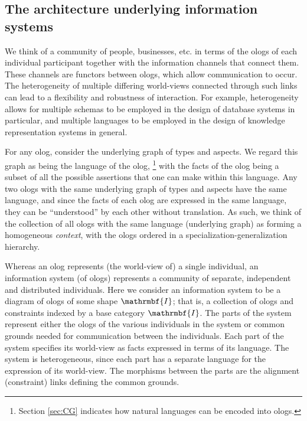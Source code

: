 \documentclass{amsart}
\theoremstyle{remark}
\theoremstyle{definition}
\begin{document}
\subsection{The architecture underlying information systems}

We think of a community of people, businesses, etc. in terms of the ologs of each individual participant together with the information channels that connect them. These channels are functors between ologs, which allow communication to occur. The heterogeneity of multiple differing world-views 
connected through such links can lead to a flexibility and robustness of interaction. 
For example, heterogeneity allows for multiple schemas to be employed in the design of database systems in particular, 
and multiple languages to be employed in the design of knowledge representation systems in general.

For any olog, consider the underlying graph of types and aspects. 
We regard this graph as being the language of the olog, 
\footnote{Section \ref{sec:CG} indicates how natural languages can be encoded into ologs.}
with the facts of the olog being a subset of all the possible assertions that one can make within this language.
Any two ologs with the same underlying graph of types and aspects have the same language,
and since the facts of each olog are expressed in the same language,
they can be ``understood'' by each other without translation.
As such, 
we think of the collection of all ologs with the same language (underlying graph) as forming a homogeneous {\em context},
with the ologs ordered in a specialization-generalization hierarchy. 

Whereas an olog represents (the world-view of) a single individual,
an information system (of ologs) represents a community of separate, independent and distributed individuals.
Here we consider an information system to be a diagram of ologs of some shape $\mathrmbf{I}$;
that is,
a collection of ologs and constraints indexed by a base category $\mathrmbf{I}$.
The parts of the system represent 
either the ologs of the various individuals in the system 
or common grounds needed for communication between the individuals.
Each part of the system specifies its world-view as facts expressed in terms of its language.
The system is heterogeneous, since each part has a separate language for the expression of its world-view. 
The morphisms between the parts are the alignment (constraint) links defining the common grounds. 
\end{document}
